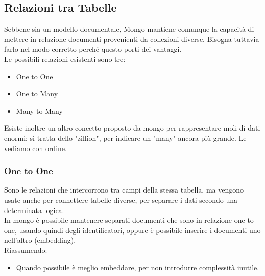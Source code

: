 \subsection{Relazioni tra Tabelle}
Sebbene sia un modello documentale, Mongo mantiene comunque la capacità di mettere in relazione documenti provenienti da collezioni diverse. Bisogna tuttavia farlo nel modo corretto perché questo porti dei vantaggi.\\

\noindent Le possibili relazioni esistenti sono tre:
\begin{itemize}
    \item One to One
    \item One to Many
    \item Many to Many
\end{itemize}
Esiste inoltre un altro concetto proposto da mongo per rappresentare moli di dati enormi: si tratta dello "zillion", per indicare un "many" ancora più grande. Le vediamo con ordine.

\subsubsection{One to One}
Sono le relazioni che intercorrono tra campi della stessa tabella, ma vengono usate anche per connettere tabelle diverse, per separare i dati secondo una determinata logica.\\
In mongo è possibile mantenere separati documenti che sono in relazione one to one, usando quindi degli identificatori, oppure è possibile inserire i documenti uno nell'altro (embedding).\\
Riassumendo:
\begin{itemize}
    \item Quando possibile è meglio embeddare, per non introdurre complessità inutile.
\end{itemize}

